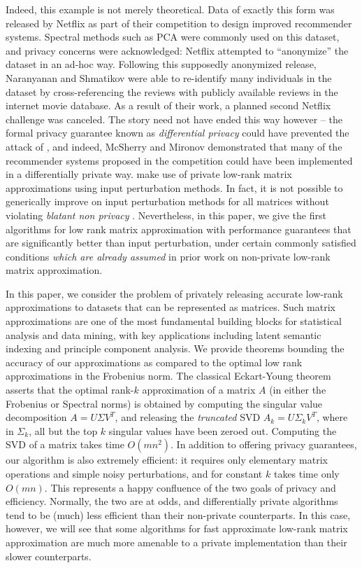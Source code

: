 \documentclass[letterpaper,11pt]{article}
\theoremstyle{definition}
\begin{document}
Indeed, this example is not merely theoretical. Data of exactly this form was
released by Netflix as part of their competition to design improved
recommender systems. Spectral methods such as PCA were commonly used on this
dataset, and privacy concerns were acknowledged: Netflix attempted to
``anonymize'' the dataset in an ad-hoc way. Following this supposedly
anonymized release, Naranyanan and Shmatikov \cite{NarayananS08} were able to
re-identify many individuals in the dataset by cross-referencing the reviews
with publicly available reviews in the internet movie database. As a result of
their work, a planned second Netflix challenge was canceled. The story need
not have ended this way however -- the formal privacy guarantee known as
\emph{differential privacy} could have prevented the attack of
\cite{NarayananS08}, and indeed, McSherry and Mironov \cite{McSherryM09}
demonstrated that many of the recommender systems proposed in the competition
could have been implemented in a differentially private way.
\cite{McSherryM09} make use of private low-rank matrix approximations using
input perturbation methods. In fact, it is not possible to generically improve
on input perturbation methods for all matrices without violating \emph{blatant
non privacy} \cite{DinurN03}. Nevertheless,  in this paper, we give the first
algorithms for low rank matrix approximation with performance guarantees that
are significantly better than input perturbation, under certain commonly
satisfied conditions \emph{which are already assumed} in prior work on
non-private low-rank matrix approximation.

In this paper, we consider the problem of privately releasing accurate
low-rank approximations to datasets that can be represented as matrices. Such
matrix approximations are one of the most fundamental building blocks for
statistical analysis and data mining, with key applications including latent
semantic indexing and principle component analysis. We provide theorems
bounding the accuracy of our approximations as compared to the optimal low
rank approximations in the Frobenius norm. The classical Eckart-Young theorem
asserts that the
optimal rank-$k$ approximation of a matrix $A$ (in either the Frobenius or
Spectral norms) is obtained by computing the singular value decomposition $A =
U\Sigma V^T$, and releasing the \emph{truncated} SVD $A_k = U\Sigma_kV^T$,
where in $\Sigma_k$, all but the top $k$ singular values have been zeroed out.
Computing the SVD of a matrix takes time $O(mn^2)$. In addition to offering
privacy guarantees, our algorithm is also extremely efficient: it requires
only elementary matrix operations and simple noisy perturbations, and for
constant $k$ takes time only $O(mn)$. This represents a happy confluence of
the two goals of privacy and efficiency. Normally, the two are at odds, and
differentially private algorithms tend to be (much) less efficient than their
non-private counterparts. In this case, however, we will see that some algorithms
for fast approximate low-rank matrix approximation are much more amenable
to a private implementation than their slower counterparts.
\end{document}
